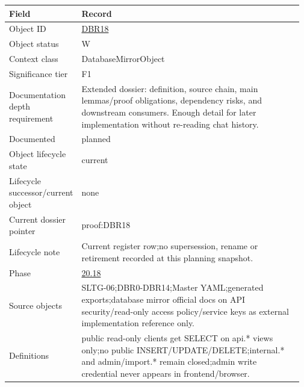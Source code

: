 \begin{longtable}{L{0.16\linewidth} L{0.81\linewidth}}
\hline
\textbf{Field} & \textbf{Record}\\
\hline
Object ID & \hyperlink{object-row-DBR18}{DBR18}\\
\hline\addlinespace[0.20em]
Object status & W\\
\hline\addlinespace[0.20em]
Context class & DatabaseMirrorObject\\
\hline\addlinespace[0.20em]
Significance tier & F1\\
\hline\addlinespace[0.20em]
Documentation depth requirement & Extended dossier: definition, source chain, main lemmas/\allowbreak{}proof obligations, dependency risks, and downstream consumers. Enough detail for later implementation without re-reading chat history.\\
\hline\addlinespace[0.20em]
Documented & planned\\
\hline\addlinespace[0.20em]
Object lifecycle state & current\\
\hline\addlinespace[0.20em]
Lifecycle successor/\allowbreak{}current object & none\\
\hline\addlinespace[0.20em]
Current dossier pointer & proof:DBR18\\
\hline\addlinespace[0.20em]
Lifecycle note & Current register row;\newline no supersession, rename or retirement recorded at this planning snapshot.\\
\hline\addlinespace[0.20em]
Phase & \hyperlink{phase-row-20-18}{20.18}\\
\hline\addlinespace[0.20em]
Source objects & SLTG-06;\newline DBR0-DBR14;\newline Master YAML;\newline generated exports;\newline database mirror official docs on API security/\allowbreak{}read-only access policy/\allowbreak{}service keys as external implementation reference only.\\
\hline\addlinespace[0.20em]
Definitions & public read-only clients get SELECT on api.* views only;\newline no public INSERT/\allowbreak{}UPDATE/\allowbreak{}DELETE;\newline internal.* and admin/\allowbreak{}import.* remain closed;\newline admin write credential never appears in frontend/\allowbreak{}browser.\\

\end{longtable}
